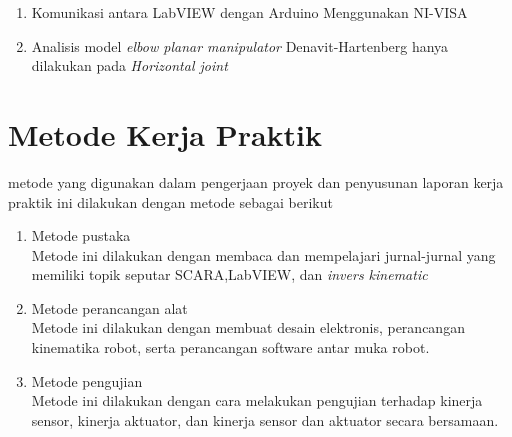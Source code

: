 	\begin{enumerate}
		
		\item Komunikasi antara LabVIEW dengan Arduino Menggunakan NI-VISA
		\item Analisis model \textit{elbow planar manipulator} Denavit-Hartenberg hanya dilakukan pada \textit{Horizontal joint}
		
	\end{enumerate}

\section{Metode Kerja Praktik}
metode yang digunakan dalam pengerjaan proyek dan penyusunan laporan kerja praktik ini dilakukan dengan metode sebagai berikut

\begin{enumerate}
	\item Metode pustaka\\
	Metode ini dilakukan dengan membaca dan mempelajari jurnal-jurnal yang memiliki topik seputar SCARA,LabVIEW, dan \textit{invers kinematic}
	
	\item Metode perancangan alat\\
	Metode ini dilakukan dengan membuat desain elektronis, perancangan kinematika robot, serta perancangan software antar muka robot.
	
	\item Metode pengujian\\
	Metode ini dilakukan dengan cara melakukan pengujian terhadap kinerja sensor, kinerja aktuator, dan kinerja sensor dan aktuator secara bersamaan.
	
\end{enumerate}

